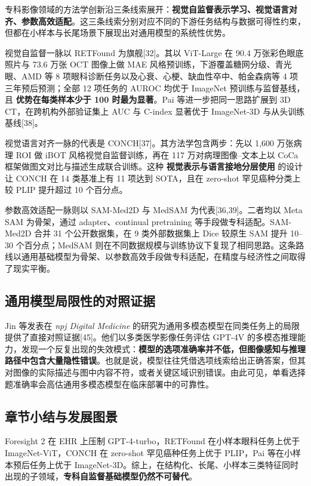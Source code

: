 专科影像领域的方法学创新沿三条线索展开：\textbf{视觉自监督表示学习、视觉语言对齐、参数高效适配}。这三条线索分别对应不同的下游任务结构与数据可得性约束，但都在小样本与长尾场景下展现出对通用模型的系统性优势。

视觉自监督一脉以 RETFound 为旗舰[32]。其以 ViT-Large 在 90.4 万张彩色眼底照片与 73.6 万张 OCT 图像上做 MAE 风格预训练，下游覆盖糖网分级、青光眼、AMD 等 8 项眼科诊断任务以及心衰、心梗、缺血性卒中、帕金森病等 4 项三年预后预测；全部 12 项任务的 AUROC 均优于 ImageNet 预训练与监督基线，且 \textbf{优势在每类样本少于 100 时最为显著}。Pai 等进一步把同一思路扩展到 3D CT，在跨机构外部验证集上 AUC 与 C-index 显著优于 ImageNet-3D 与从头训练基线[38]。

视觉语言对齐一脉的代表是 CONCH[37]。其方法学包含两步：先以 1,600 万张病理 ROI 做 iBOT 风格视觉自监督训练，再在 117 万对病理图像--文本上以 CoCa 框架做图文对比与描述生成联合训练。这种 \textbf{视觉表示与语言接地分层使用} 的设计让 CONCH 在 14 类基准上有 11 项达到 SOTA，且在 zero-shot 罕见癌种分类上较 PLIP 提升超过 10 个百分点。

参数高效适配一脉则以 SAM-Med2D 与 MedSAM 为代表[36,39]。二者均以 Meta SAM 为骨架，通过 adapter、continual pretraining 等手段做专科适配。SAM-Med2D 合并 31 个公开数据集，在 9 类外部数据集上 Dice 较原生 SAM 提升 10--30 个百分点；MedSAM 则在不同数据规模与训练协议下复现了相同思路。这条路线以通用基础模型为骨架、以参数高效手段做专科适配，在精度与经济性之间取得了现实平衡。

\subsection{通用模型局限性的对照证据}

Jin 等发表在 \textit{npj Digital Medicine} 的研究为通用多模态模型在同类任务上的局限提供了直接对照证据[45]。他们以多类医学影像任务评估 GPT-4V 的多模态推理能力，发现一个反复出现的失效模式：\textbf{模型的选项准确率并不低，但图像感知与推理路径中包含大量隐性错误}。也就是说，模型往往凭借选项线索给出正确答案，但其对图像的实际描述与图中内容不符，或者关键区域识别错误。由此可见，单看选择题准确率会高估通用多模态模型在临床部署中的可靠性。

\subsection{章节小结与发展图景}

Foresight 2 在 EHR 上压制 GPT-4-turbo，RETFound 在小样本眼科任务上优于 ImageNet-ViT，CONCH 在 zero-shot 罕见癌种任务上优于 PLIP，Pai 等在小样本预后任务上优于 ImageNet-3D。综上，在结构化、长尾、小样本三类特征同时出现的子领域，\textbf{专科自监督基础模型仍然不可替代}。

